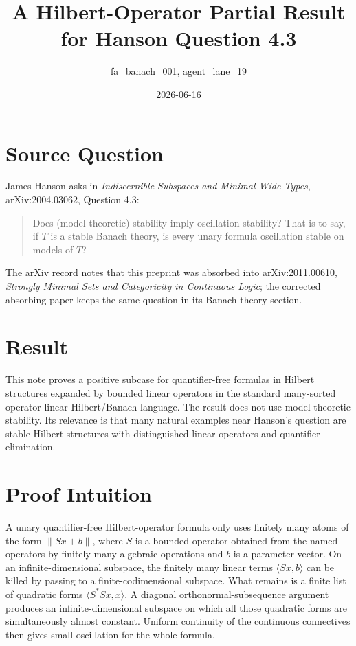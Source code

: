 \documentclass[11pt]{article}
\title{A Hilbert-Operator Partial Result for Hanson Question 4.3}
\author{fa\_banach\_001, agent\_lane\_19}
\date{2026-06-16}
\begin{document}
\maketitle

\section*{Source Question}

James Hanson asks in \emph{Indiscernible Subspaces and Minimal Wide Types},
arXiv:2004.03062, Question 4.3:
\begin{quote}
Does (model theoretic) stability imply oscillation stability? That is to say,
if \(T\) is a stable Banach theory, is every unary formula oscillation stable
on models of \(T\)?
\end{quote}
The arXiv record notes that this preprint was absorbed into arXiv:2011.00610,
\emph{Strongly Minimal Sets and Categoricity in Continuous Logic}; the corrected
absorbing paper keeps the same question in its Banach-theory section.

\section*{Result}

This note proves a positive subcase for quantifier-free formulas in Hilbert
structures expanded by bounded linear operators in the standard many-sorted
operator-linear Hilbert/Banach language.  The result does not use
model-theoretic stability.  Its relevance is that many natural examples near
Hanson's question are stable Hilbert structures with distinguished linear
operators and quantifier elimination.

\section*{Proof Intuition}

A unary quantifier-free Hilbert-operator formula only uses finitely many atoms
of the form \(\|Sx+b\|\), where \(S\) is a bounded operator obtained from the
named operators by finitely many algebraic operations and \(b\) is a parameter
vector.  On an infinite-dimensional subspace, the finitely many linear terms
\(\langle Sx,b\rangle\) can be killed by passing to a finite-codimensional
subspace.  What remains is a finite list of quadratic forms
\(\langle S^*Sx,x\rangle\).  A diagonal orthonormal-subsequence argument
produces an infinite-dimensional subspace on which all those quadratic forms
are simultaneously almost constant.  Uniform continuity of the continuous
connectives then gives small oscillation for the whole formula.
\end{document}
